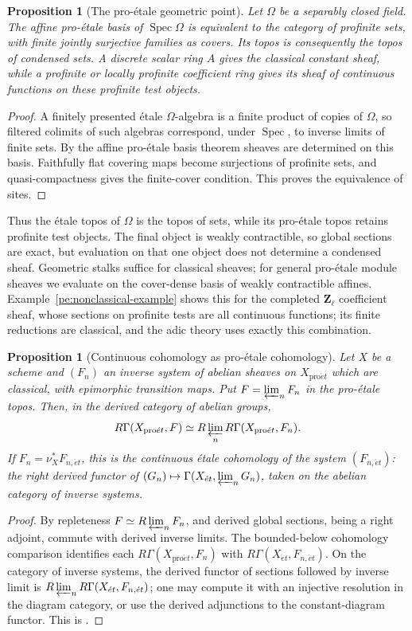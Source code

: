 \documentclass[11pt,a4paper]{article}
\numberwithin{equation}{section}
\newtheorem{proposition}[theorem]{Proposition}
\theoremstyle{definition}
\theoremstyle{remark}
\newcommand{\et}{\acute{e}t}
\newcommand{\proet}{\mathrm{pro}\acute{e}t}
\begin{document}
\begin{proposition}[The pro-\'etale geometric point]
\label{pe:condensed-point}
Let $\Omega$ be a separably closed field. The affine pro-\'etale
basis of $\operatorname{Spec}\Omega$ is equivalent to the category
of profinite sets, with finite jointly surjective families as covers.
Its topos is consequently the topos of condensed sets. A discrete
scalar ring $A$ gives the classical constant sheaf, while a profinite
or locally profinite coefficient ring gives its sheaf of continuous
functions on these profinite test objects.
\end{proposition}
\begin{proof}
A finitely presented \'etale $\Omega$-algebra is a finite product of
copies of $\Omega$, so filtered colimits of such algebras correspond,
under $\operatorname{Spec}$, to inverse limits of finite sets. By the
affine pro-\'etale basis theorem sheaves are determined on this basis.
Faithfully flat covering maps become surjections of profinite sets,
and quasi-compactness gives the finite-cover condition. This proves
the equivalence of sites.
\end{proof}

Thus the \'etale topos of $\Omega$ is the topos of sets, while its
pro-\'etale topos retains profinite test objects. The final object is
weakly contractible, so global sections are exact, but evaluation on
that one object does not determine a condensed sheaf. Geometric stalks
suffice for classical sheaves; for general pro-\'etale module sheaves
we evaluate on the cover-dense basis of weakly contractible affines.
Example~\ref{pe:nonclassical-example} shows this for the completed
$\mathbf Z_\ell$ coefficient sheaf, whose sections on profinite tests
are all continuous functions; its finite reductions are classical,
and the adic theory uses exactly this combination.

\begin{proposition}[Continuous cohomology as pro-\'etale cohomology]
\label{pe:continuous-cohomology}
Let $X$ be a scheme and $(F_n)$ an inverse system of abelian sheaves
on $X_{\proet}$ which are classical, with epimorphic transition maps.
Put $F=\varprojlim_nF_n$ in the pro-\'etale topos. Then, in the
derived category of abelian groups,
\[
 R\Gamma(X_{\proet},F)
    \simeq R\varprojlim_n R\Gamma(X_{\proet},F_n).
\]
If $F_n=\nu_X^*F_{n,\et}$, this is the continuous \'etale cohomology
of the system $(F_{n,\et})$: the right derived functor of
$(G_n)\mapsto\Gamma(X_{\et},\varprojlim_nG_n)$, taken on the
abelian category of inverse systems.
\end{proposition}
\begin{proof}
By repleteness $F\simeq R\varprojlim_nF_n$, and derived global
sections, being a right adjoint, commute with derived inverse limits.
The bounded-below cohomology comparison identifies each
$R\Gamma(X_{\proet},F_n)$ with $R\Gamma(X_{\et},F_{n,\et})$. On the
category of inverse systems, the derived functor of sections followed
by inverse limit is $R\varprojlim_nR\Gamma(X_{\et},F_{n,\et})$; one
may compute it with an injective resolution in the diagram category,
or use the derived adjunctions to the constant-diagram functor. This
is \cite[Proposition~5.6.2]{BS}.
\end{proof}
\end{document}
